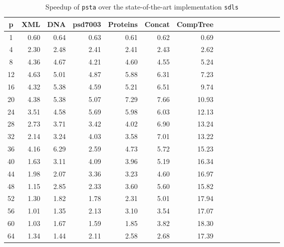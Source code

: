 \begin{table}[ht]
  \centering
  \begin{tabular}{crrrrrrrrrrrrrrr}
    \hline
    p & XML  & DNA  & psd7003 & Proteins & Concat & CompTree \\
    \hline
    1       & 0.60 & 0.64 & 0.63    & 0.61     & 0.62   & 0.69     \\
    4       & 2.30 & 2.48 & 2.41    & 2.41     & 2.43   & 2.62     \\
    8       & 4.36 & 4.67 & 4.21    & 4.60     & 4.55   & 5.24     \\
    12      & 4.63 & 5.01 & 4.87    & 5.88     & 6.31   & 7.23     \\
    16      & 4.32 & 5.38 & 4.59    & 5.21     & 6.51   & 9.74     \\
    20      & 4.38 & 5.38 & 5.07    & 7.29     & 7.66   & 10.93    \\
    24      & 3.51 & 4.58 & 5.69    & 5.98     & 6.03   & 12.13    \\
    28      & 2.73 & 3.71 & 3.42    & 4.02     & 6.90   & 13.24    \\
    32      & 2.14 & 3.24 & 4.03    & 3.58     & 7.01   & 13.22    \\
    36      & 4.16 & 6.29 & 2.59    & 4.73     & 5.72   & 15.23    \\
    40      & 1.63 & 3.11 & 4.09    & 3.96     & 5.19   & 16.34    \\
    44      & 1.98 & 2.07 & 3.36    & 3.23     & 4.60   & 16.97    \\
    48      & 1.15 & 2.85 & 2.33    & 3.60     & 5.60   & 15.82    \\
    52      & 1.30 & 1.82 & 1.78    & 2.31     & 5.01   & 17.94    \\
    56      & 1.01 & 1.35 & 2.13    & 3.10     & 3.54   & 17.07    \\
    60      & 1.03 & 1.67 & 1.59    & 1.85     & 3.82   & 18.30    \\
    64      & 1.34 & 1.44 & 2.11    & 2.58     & 2.68   & 17.39    \\
    \hline\hline
\end{tabular}
\caption{Speedup of {\tt psta} over the state-of-the-art implementation {\tt sdls}}
\label{tbl:speedup}
\end{table}
